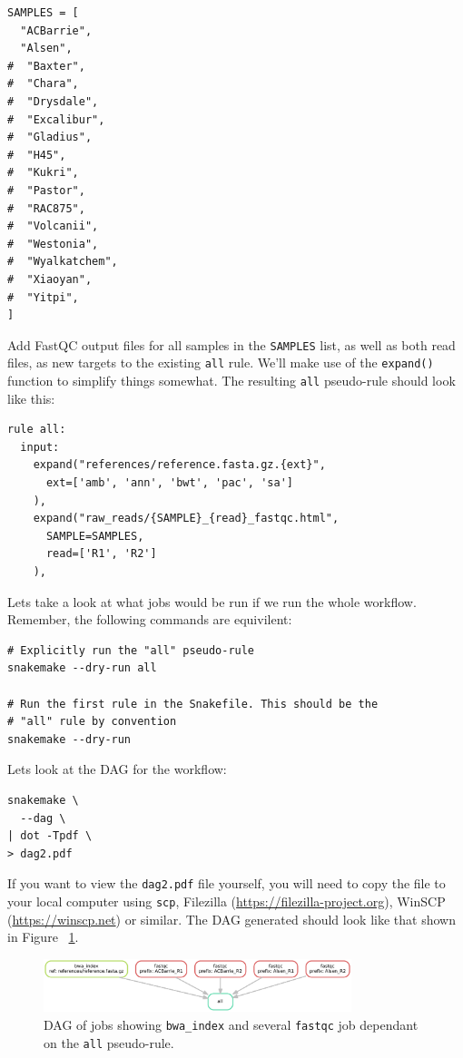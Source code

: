 \begin{lstlisting}
SAMPLES = [
  "ACBarrie",
  "Alsen",
#  "Baxter",
#  "Chara",
#  "Drysdale",
#  "Excalibur",
#  "Gladius",
#  "H45",
#  "Kukri",
#  "Pastor",
#  "RAC875",
#  "Volcanii",
#  "Westonia",
#  "Wyalkatchem",
#  "Xiaoyan",
#  "Yitpi",
]
\end{lstlisting}

Add FastQC output files for all samples in the \texttt{SAMPLES} list, as well as both read files, as new targets to the existing \texttt{all} rule.
We'll make use of the \texttt{expand()} function to simplify things somewhat.
The resulting \texttt{all} pseudo-rule should look like this:

\begin{lstlisting}
rule all:
  input:
    expand("references/reference.fasta.gz.{ext}",
      ext=['amb', 'ann', 'bwt', 'pac', 'sa']
    ),
    expand("raw_reads/{SAMPLE}_{read}_fastqc.html",
      SAMPLE=SAMPLES,
      read=['R1', 'R2']
    ),
\end{lstlisting}

Lets take a look at what jobs would be run if we run the whole workflow.
Remember, the following commands are equivilent:

\begin{lstlisting}
# Explicitly run the "all" pseudo-rule
snakemake --dry-run all

# Run the first rule in the Snakefile. This should be the
# "all" rule by convention
snakemake --dry-run
\end{lstlisting}

Lets look at the DAG for the workflow:

\begin{lstlisting}
snakemake \
  --dag \
| dot -Tpdf \
> dag2.pdf
\end{lstlisting}

\begin{warning}

If you want to view the \texttt{dag2.pdf} file yourself, you will need to copy the file to your local computer using \texttt{scp}, Filezilla (\url{https://filezilla-project.org}), WinSCP (\url{https://winscp.net}) or similar.
The DAG generated should look like that shown in Figure ~\ref{fig:dag2}.

\end{warning}

\begin{figure}[H]
\centering
\includegraphics[width=0.8\textwidth]{handout/dag2.pdf}
\caption{DAG of jobs showing \texttt{bwa\_index} and several \texttt{fastqc} job dependant on the \texttt{all} pseudo-rule.}
\label{fig:dag2}
\end{figure}


